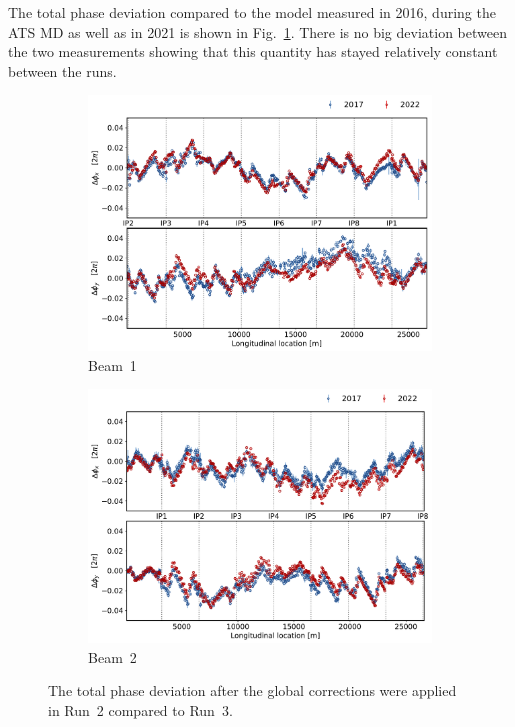\documentclass[a4paper]{cernatsnote}
\begin{document}
The total phase deviation compared to the model measured in 2016, during the ATS MD as well as in 2021 is shown in Fig.~\ref{fig:2017_total_phase_vs_2021}. There is no big deviation between the two measurements showing that this quantity has stayed relatively constant between the runs. 
\begin{figure}[ht]
\begin{subfigure}{.5\textwidth}
  \centering
  \includegraphics[width=.99\linewidth]{plots/beam1/total_phase_after_corr_2017_vs_2021.pdf}  
  \caption{Beam~1}
\end{subfigure}
\begin{subfigure}{.5\textwidth}
  \centering
  \includegraphics[width=.99\linewidth]{plots/beam2/total_phase_after_corr_2017_vs_2021_beam2.pdf}  
  \caption{Beam~2}
\end{subfigure}
\caption{The total phase deviation after the global corrections were applied in Run~2 compared to Run~3.}
\label{fig:2017_total_phase_vs_2021}
\end{figure}
\end{document}
